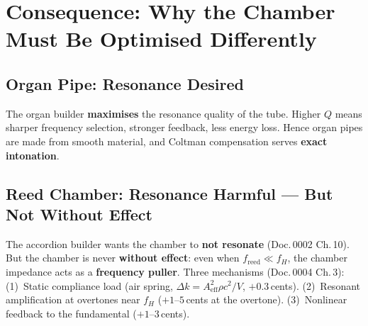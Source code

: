 \documentclass[11pt,a4paper]{article}
\begin{document}
\section{Consequence: Why the Chamber Must Be Optimised Differently}

\subsection{Organ Pipe: Resonance Desired}

The organ builder \textbf{maximises} the resonance quality of the tube. Higher $Q$ means sharper frequency selection, stronger feedback, less energy loss. Hence organ pipes are made from smooth material, and Coltman compensation serves \textbf{exact intonation}.

\subsection{Reed Chamber: Resonance Harmful --- But Not Without Effect}

The accordion builder wants the chamber to \textbf{not resonate} (Doc.\,0002 Ch.\,10). But the chamber is never \textbf{without effect}: even when $f_\text{reed} \ll f_H$, the chamber impedance acts as a \textbf{frequency puller}. Three mechanisms (Doc.\,0004 Ch.\,3): (1)~Static compliance load (air spring, $\Delta k = A_\text{eff}^2 \rho c^2/V$, $+0{.}3$\,cents). (2)~Resonant amplification at overtones near $f_H$ ($+1$--$5$\,cents at the overtone). (3)~Nonlinear feedback to the fundamental ($+1$--$3$\,cents).

\begin{table}[H]
\centering\small
{}
\caption{Quantitative comparison: organ pipe (C2 stopped) vs.\ bass reed (50\,Hz)}
\end{table}
\end{document}
